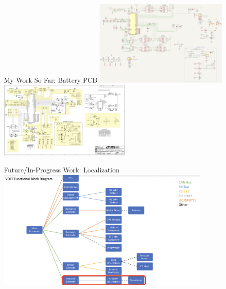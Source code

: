 \begin{frame}{My Work So Far: Battery PCB}
    \centering
    \includegraphics[height=0.5\textheight,width=0.5\textwidth,keepaspectratio]{images/VOLT/batterypcbschematic.png}
    \includegraphics[height=0.5\textheight,width=0.5\textwidth,keepaspectratio]{images/VOLT/demo-board-schematic.png}
\end{frame}

\begin{frame}{Future/In-Progress Work: Localization}
    \centering
    \includegraphics[height=0.8\textheight,width=0.8\textwidth,keepaspectratio]{images/VOLT/volt-blockdiagram.png}
\end{frame}
    


